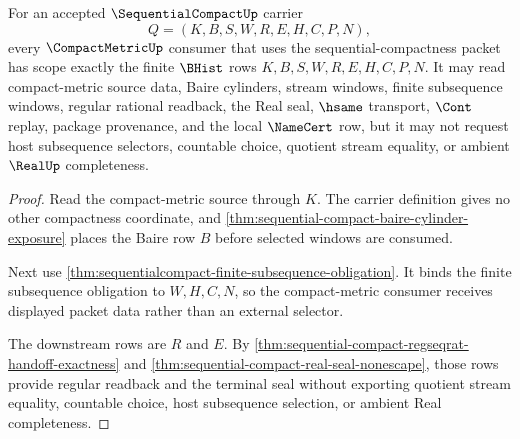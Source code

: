 \begin{theorem}
\label{thm:sequentialcompact-compactmetric-consumer-scope}
For an accepted $\SequentialCompactUp$ carrier
$$
Q=(K,B,S,W,R,E,H,C,P,N),
$$
every $\CompactMetricUp$ consumer that uses the sequential-compactness packet has scope exactly the finite $\BHist$ rows $K,B,S,W,R,E,H,C,P,N$. It may read compact-metric source data, Baire cylinders, stream windows, finite subsequence windows, regular rational readback, the Real seal, $\hsame$ transport, $\Cont$ replay, package provenance, and the local $\NameCert$ row, but it may not request host subsequence selectors, countable choice, quotient stream equality, or ambient $\RealUp$ completeness.
\end{theorem}
\begin{proof}
Read the compact-metric source through $K$. The carrier definition gives no other compactness coordinate, and \autoref{thm:sequential-compact-baire-cylinder-exposure} places the Baire row $B$ before selected windows are consumed.

Next use \autoref{thm:sequentialcompact-finite-subsequence-obligation}. It binds the finite subsequence obligation to $W,H,C,N$, so the compact-metric consumer receives displayed packet data rather than an external selector.

The downstream rows are $R$ and $E$. By \autoref{thm:sequential-compact-regseqrat-handoff-exactness} and \autoref{thm:sequential-compact-real-seal-nonescape}, those rows provide regular readback and the terminal seal without exporting quotient stream equality, countable choice, host subsequence selection, or ambient Real completeness.
\end{proof}

